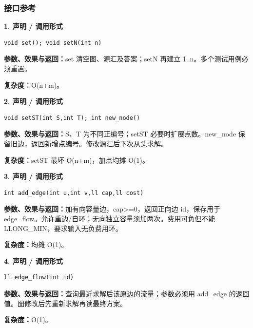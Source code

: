 \documentclass[UTF8,a4paper,10pt]{ctexart}
\begin{document}
\subsubsection*{接口参考}
\noindent\begin{minipage}{\textwidth}
\textbf{1. 声明 / 调用形式}
\begin{lstlisting}
void set(); void setN(int n)
\end{lstlisting}
\textbf{参数、效果与返回：}set 清空图、源汇及答案；setN 再建立 1..n。多个测试用例必须重置。

\textbf{复杂度：}O(n+m)。

\end{minipage}\par\vspace{0.4em}
\noindent\begin{minipage}{\textwidth}
\textbf{2. 声明 / 调用形式}
\begin{lstlisting}
void setST(int S,int T); int new_node()
\end{lstlisting}
\textbf{参数、效果与返回：}S、T 为不同正编号；setST 必要时扩展点数。new\_node 保留旧边，返回新增点编号。修改源汇后下次从头求解。

\textbf{复杂度：}setST 最坏 O(n+m)，加点均摊 O(1)。

\end{minipage}\par\vspace{0.4em}
\noindent\begin{minipage}{\textwidth}
\textbf{3. 声明 / 调用形式}
\begin{lstlisting}
int add_edge(int u,int v,ll cap,ll cost)
\end{lstlisting}
\textbf{参数、效果与返回：}加有向容量边，cap>=0，返回正向边 id，保存用于 edge\_flow。允许重边/自环；无向独立容量须加两次。费用可负但不能 LLONG\_MIN，要求输入无负费用环。

\textbf{复杂度：}均摊 O(1)。

\end{minipage}\par\vspace{0.4em}
\noindent\begin{minipage}{\textwidth}
\textbf{4. 声明 / 调用形式}
\begin{lstlisting}
ll edge_flow(int id)
\end{lstlisting}
\textbf{参数、效果与返回：}查询最近求解后该原边的流量；参数必须用 add\_edge 的返回值。图修改后先重新求解再读最终方案。

\textbf{复杂度：}O(1)。

\end{minipage}\par\vspace{0.4em}
\end{document}
